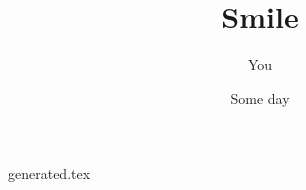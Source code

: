 \documentclass{article}
\title{Smile}
\author{You}
\date{Some day}
\begin{document}
    \maketitle
    {generated.tex}
\end{document}
